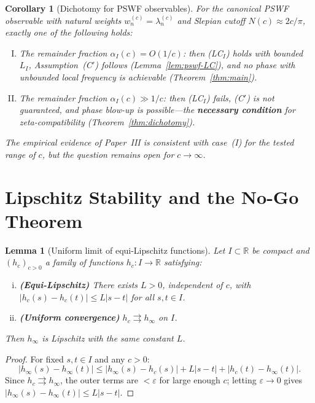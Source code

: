 \documentclass[12pt,a4paper]{amsart}
\newtheorem{lemma}[theorem]{Lemma}
\newtheorem{corollary}[theorem]{Corollary}
\theoremstyle{definition}
\begin{document}
\begin{corollary}[Dichotomy for PSWF observables]
\label{cor:LC-dichotomy}
For the canonical PSWF observable with natural weights
$w_n^{(c)} = \lambda_n^{(c)}$ and Slepian cutoff
$N(c) \approx 2c/\pi$, exactly one of the following
holds:
\begin{enumerate}[(I)]
\item The remainder fraction
$\alpha_I(c) = O(1/c)$: then \textnormal{(LC$_I$)}
holds with bounded $L_I$,
Assumption~\textnormal{(C$'$)} follows
(Lemma~\ref{lem:pswf-LC}), and no phase with
unbounded local frequency is achievable
(Theorem~\ref{thm:main}).
\item The remainder fraction
$\alpha_I(c) \gg 1/c$: then \textnormal{(LC$_I$)}
fails, (C$'$) is not guaranteed, and phase blow-up
is possible---the \textbf{necessary condition} for
zeta-compatibility (Theorem~\ref{thm:dichotomy}).
\end{enumerate}
The empirical evidence of Paper~III is consistent
with case~(I) for the tested range of $c$, but the
question remains open for $c \to \infty$.
\end{corollary}

\section{Lipschitz Stability and the No-Go Theorem}
\label{sec:nogo}

\begin{lemma}[Uniform limit of equi-Lipschitz
functions]
\label{lem:equilip}
Let $I \subset \mathbb{R}$ be compact and
$(h_c)_{c>0}$ a family of functions
$h_c : I \to \mathbb{R}$ satisfying:
\begin{enumerate}[(i)]
\item \textbf{(Equi-Lipschitz)} There exists $L > 0$,
independent of $c$, with
$|h_c(s) - h_c(t)| \le L|s-t|$
for all $s,t \in I$.
\item \textbf{(Uniform convergence)}
$h_c \rightrightarrows h_\infty$ on $I$.
\end{enumerate}
Then $h_\infty$ is Lipschitz with the same
constant $L$.
\end{lemma}

\begin{proof}
For fixed $s,t \in I$ and any $c > 0$:
\[
|h_\infty(s) - h_\infty(t)|
\le |h_\infty(s) - h_c(s)|
+ L|s-t|
+ |h_c(t) - h_\infty(t)|.
\]
Since $h_c \rightrightarrows h_\infty$, the outer
terms are $< \varepsilon$ for large enough $c$;
letting $\varepsilon \to 0$ gives
$|h_\infty(s) - h_\infty(t)| \le L|s-t|$.
\end{proof}
\end{document}
